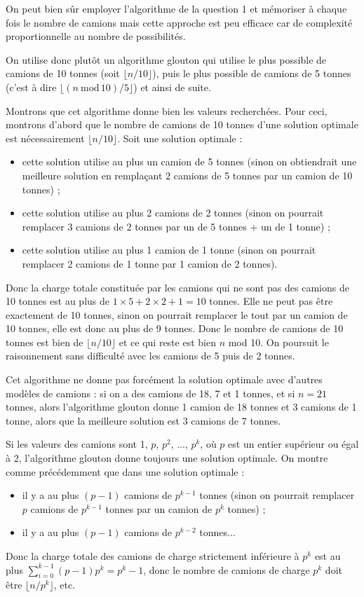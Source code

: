 \Q
On peut bien sûr employer l'algorithme de la question 1 et mémoriser à chaque fois le nombre de camions mais cette approche est peu efficace car de complexité proportionnelle au nombre de possibilités.
\medskip

On utilise donc plutôt un algorithme glouton qui utilise le plus possible de camions de 10 tonnes (soit $\lfloor n/10 \rfloor$), puis le plus possible de camions de 5 tonnes (c'est à dire $\lfloor (n\ \textrm{mod}\,10)/5\rfloor$) et ainsi de suite.



Montrons que cet algorithme donne bien les valeurs recherchées. Pour ceci, montrons d'abord que le nombre de camions de 10 tonnes d'une solution optimale est nécessairement $\lfloor n/10 \rfloor$. Soit une solution optimale :
\begin{itemize}
    \item cette solution utilise au plus un camion de 5 tonnes (sinon on obtiendrait une meilleure solution en remplaçant 2 camions de 5 tonnes par un camion de 10 tonnes) ;
    \item cette solution utilise au plus 2 camions de 2 tonnes (sinon on pourrait remplacer 3 camions de 2 tonnes par un de 5 tonnes + un de 1 tonne) ;
    \item cette solution utilise au plus 1 camion de 1 tonne (sinon on pourrait remplacer 2 camions de 1 tonne par 1 camion de 2 tonnes).
\end{itemize}
Donc la charge totale constituée par les camions qui ne sont pas des camions de 10 tonnes est au plus de $1\times5 + 2\times2 + 1=10$ tonnes. Elle ne peut pas être exactement de 10 tonnes, sinon on pourrait remplacer le tout par un camion de 10 tonnes, elle est donc au plus de 9 tonnes. Donc le nombre de camions de 10 tonnes est bien de $\lfloor n/10 \rfloor$ et ce qui reste est bien $n$ mod 10. On poursuit le raisonnement sans difficulté avec les camions de 5 puis de 2 tonnes.
\medskip

Cet algorithme ne donne pas forcément la solution optimale avec d'autres modèles de camions : si on a des camions de 18, 7 et 1 tonnes, et si $n=21$ tonnes, alors l'algorithme glouton donne 1 camion de 18 tonnes et 3 camions de 1 tonne, alors que la meilleure solution est 3 camions de 7 tonnes.
\medskip

Si les valeurs des camions sont 1, $p$, $p^2$, ..., $p^k$, où $p$ est un entier supérieur ou égal à 2, l'algorithme glouton donne toujours une solution optimale. On montre comme précédemment que dans une solution optimale :
\begin{itemize}
    \item il y a au plus $(p-1)$ camions de $p^{k-1}$ tonnes (sinon on pourrait remplacer $p$ camions de $p^{k-1}$ tonnes par un camion de $p^k$ tonnes) ;
    \item il y a au plus $(p-1)$ camions de $p^{k-2}$ tonnes...
\end{itemize}
Donc la charge totale des camions de charge strictement inférieure à $p^k$ est au plus $\sum_{i=0}^{k-1}(p-1)p^k=p^k-1$, donc le nombre de camions de charge $p^k$ doit être $\lfloor n/p^k \rfloor$, etc.
\bigskip

\Fin
